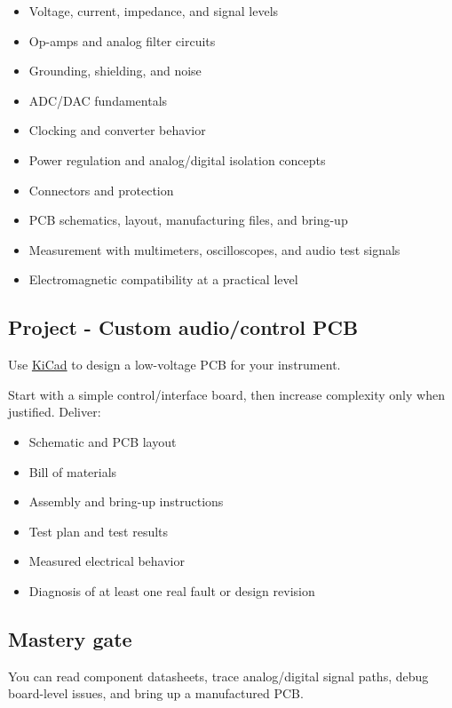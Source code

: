 \documentclass[11pt,letterpaper]{article}
\begin{document}
\begin{itemize}
\item Voltage, current, impedance, and signal levels
\item Op-amps and analog filter circuits
\item Grounding, shielding, and noise
\item ADC/DAC fundamentals
\item Clocking and converter behavior
\item Power regulation and analog/digital isolation concepts
\item Connectors and protection
\item PCB schematics, layout, manufacturing files, and bring-up
\item Measurement with multimeters, oscilloscopes, and audio test signals
\item Electromagnetic compatibility at a practical level
\end{itemize}

\subsection*{Project - Custom audio/control PCB}\label{project-custom-audiocontrol-pcb}

Use \href{https://www.kicad.org/}{KiCad} to design a low-voltage PCB for your instrument.

Start with a simple control/interface board, then increase complexity only when justified. Deliver:

\begin{itemize}
\item Schematic and PCB layout
\item Bill of materials
\item Assembly and bring-up instructions
\item Test plan and test results
\item Measured electrical behavior
\item Diagnosis of at least one real fault or design revision
\end{itemize}

\subsection*{Mastery gate}\label{mastery-gate-8}

You can read component datasheets, trace analog/digital signal paths, debug board-level issues, and bring up a manufactured PCB.
\end{document}
